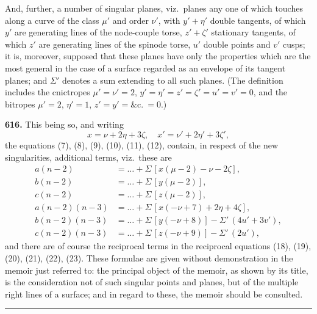 \documentclass[11pt,a4paper]{article}
\newcommand{\artno}[1]{\textbf{#1.}\quad}
\begin{document}
And, further, a number of singular planes, viz.\ planes any one of which
touches along a curve of the class $\mu'$ and order $\nu'$, with
$y' + \eta'$ double tangents, of which $y'$ are generating lines of the
node-couple torse, $z' + \zeta'$ stationary tangents, of which $z'$ are
generating lines of the spinode torse, $u'$ double points and $v'$ cusps; it
is, moreover, supposed that these planes have only the properties which are
the most general in the case of a surface regarded as an envelope of its
tangent planes; and $\Sigma'$ denotes a sum extending to all such planes.
(The definition includes the cnictropes $\mu' = \nu' = 2$,
$y' = \eta' = z' = \zeta' = u' = v' = 0$, and the bitropes $\mu' = 2$,
$\eta' = 1$, $z' = y' = \&\text{c}.\ = 0$.)

\medskip

\artno{616} This being so, and writing
\[
  x = \nu + 2\eta + 3\zeta, \quad x' = \nu' + 2\eta' + 3\zeta',
\]
the equations (7), (8), (9), (10), (11), (12), contain, in respect of the
new singularities, additional terms, viz.\ these are
\begin{align*}
  a(n-2) & = \dots + \Sigma\,[x(\mu - 2) - \nu - 2\zeta], \\
  b(n-2) & = \dots + \Sigma\,[y(\mu - 2)], \\
  c(n-2) & = \dots + \Sigma\,[z(\mu - 2)], \\
  a(n-2)(n-3) & = \dots + \Sigma\,[x(-\nu + 7) + 2\eta + 4\zeta], \\
  b(n-2)(n-3) & = \dots + \Sigma\,[y(-\nu + 8)] - \Sigma'\,(4u' + 3v'), \\
  c(n-2)(n-3) & = \dots + \Sigma\,[z(-\nu + 9)] - \Sigma'\,(2u'),
\end{align*}
and there are of course the reciprocal terms in the reciprocal equations
(18), (19), (20), (21), (22), (23).  These formulae are given without
demonstration in the memoir just referred to: the principal object of the
memoir, as shown by its title, is the consideration not of such singular
points and planes, but of the multiple right lines of a surface; and in
regard to these, the memoir should be consulted.

\bigskip
\noindent\rule{0.35\textwidth}{0.4pt}\\[2pt]

\end{document}
